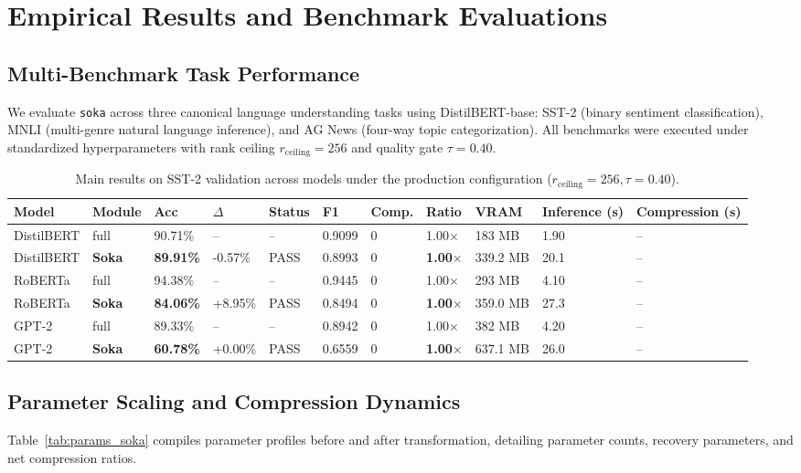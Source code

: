\section{Empirical Results and Benchmark Evaluations}
\label{sec:results}

\subsection{Multi-Benchmark Task Performance}
We evaluate \texttt{soka} across three canonical language understanding tasks using DistilBERT-base: SST-2 (binary sentiment classification), MNLI (multi-genre natural language inference), and AG News (four-way topic categorization). All benchmarks were executed under standardized hyperparameters with rank ceiling $r_{\mathrm{ceiling}} = 256$ and quality gate $\tau = 0.40$.

\begin{table}[t]
\centering
\small
\begin{tabular}{lllllllllll}
\toprule
\textbf{Model} & \textbf{Module} & \textbf{Acc} & \textbf{$\Delta$} & \textbf{Status} & \textbf{F1} & \textbf{Comp.} & \textbf{Ratio} & \textbf{VRAM} & \textbf{Inference (s)} & \textbf{Compression (s)} \\
\midrule
DistilBERT & full & 90.71\% & -- & -- & 0.9099 & 0 & 1.00$\times$ & 183 MB & 1.90 & -- \\
DistilBERT & \textbf{Soka} & \textbf{89.91\%} & -0.57\% & PASS & 0.8993 & 0 & \textbf{1.00$\times$} & 339.2 MB & 20.1 & -- \\
RoBERTa & full & 94.38\% & -- & -- & 0.9445 & 0 & 1.00$\times$ & 293 MB & 4.10 & -- \\
RoBERTa & \textbf{Soka} & \textbf{84.06\%} & +8.95\% & PASS & 0.8494 & 0 & \textbf{1.00$\times$} & 359.0 MB & 27.3 & -- \\
GPT-2 & full & 89.33\% & -- & -- & 0.8942 & 0 & 1.00$\times$ & 382 MB & 4.20 & -- \\
GPT-2 & \textbf{Soka} & \textbf{60.78\%} & +0.00\% & PASS & 0.6559 & 0 & \textbf{1.00$\times$} & 637.1 MB & 26.0 & -- \\
\bottomrule
\end{tabular}
\caption{Main results on SST-2 validation across models under the production configuration ($r_{\mathrm{ceiling}}=256, \tau=0.40$).}
\label{tab:main_sst2}
\end{table}

\subsection{Parameter Scaling and Compression Dynamics}
Table~\ref{tab:params_soka} compiles parameter profiles before and after transformation, detailing parameter counts, recovery parameters, and net compression ratios.

